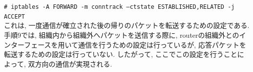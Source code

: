 \begin{enumerate}[label=\arabic*.]
        \texttt{\# iptables -A FORWARD -m conntrack --ctstate ESTABLISHED,RELATED -j ACCEPT} \\

        これは, 一度通信が確立された後の帰りのパケットを転送するための設定である.\\
        手順9では, 組織内から組織外へパケットを送信する際に, routerの組織外とのインターフェースを用いて通信を行うための設定は行っているが,
        応答パケットを転送するための設定は行っていない. 
        したがって, ここでこの設定を行うことによって, 双方向の通信が実現される.
        

        \quad
        
        
        

\end{enumerate}

\newpage


% 